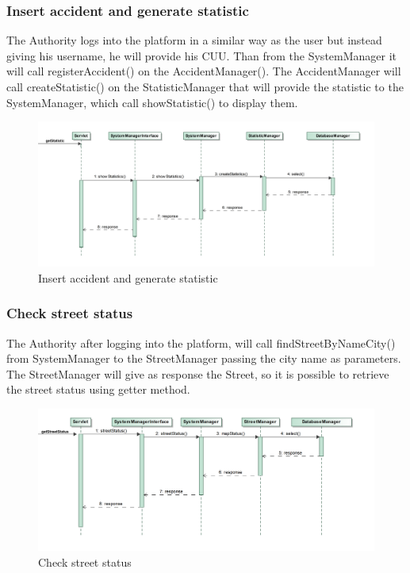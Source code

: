 \subsubsection{Insert accident and generate statistic}
The Authority logs into the platform in a similar way as the user but instead giving his username, he will provide his CUU. Than from the SystemManager it will call registerAccident() on the AccidentManager(). The AccidentManager will call createStatistic() on the StatisticManager that will provide the statistic to the SystemManager, which call showStatistic() to display them.
\begin{figure}
	\centering
	\includegraphics[width=0.95\linewidth, height=0.45\textheight]{Images/RunTimeDiagram/Sequence4}
	\caption{Insert accident and generate statistic}
	\label{fig:Insert accident and generate statistic}
\end{figure}
\subsubsection{Check street status}
The Authority after logging into the platform, will call findStreetByNameCity() from SystemManager to the StreetManager passing the city name as parameters. The StreetManager will give as response the Street, so it is possible to retrieve the street status using getter method.
\begin{figure}
	\centering
	\includegraphics[width=0.95\linewidth, height=0.35\textheight]{Images/RunTimeDiagram/Sequence5}
	\caption{Check street status}
	\label{fig:Check street status}
\end{figure}
